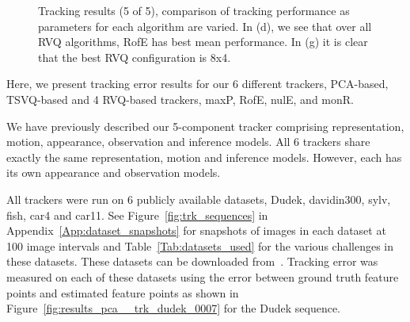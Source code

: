 \begin{figure}[h!]
								\caption{Tracking results (5 of 5), comparison of tracking performance as parameters for each algorithm are varied.  In (d), we see that over all RVQ algorithms, RofE has best mean performance.  In (g) it is clear that the best RVQ configuration is 8x4.}
								\label{fig:results_final_5_configs}
								\end{figure}


Here, we present tracking error results for our 6 different trackers, PCA-based, TSVQ-based and 4 RVQ-based trackers, maxP, RofE, nulE, and monR.


We have previously described our 5-component tracker comprising representation, motion, appearance, observation and inference models.  All 6 trackers share exactly the same representation, motion and inference models.  However, each has its own appearance and observation models.

All trackers were run on 6 publicly available datasets, Dudek, davidin300, sylv, fish, car4 and car11.  See Figure~\ref{fig:trk_sequences} in Appendix~\ref{App:dataset_snapshots} for snapshots of images in each dataset at 100 image intervals and Table~\ref{Tab:datasets_used} for the various challenges in these datasets.  These datasets can be downloaded from~\cite{2008_JNL_subspaceTRK_Ross}.  Tracking error was measured on each of these datasets using the error between ground truth feature points and estimated feature points as shown in Figure~\ref{fig:results_pca__trk_dudek_0007} for the Dudek sequence.


